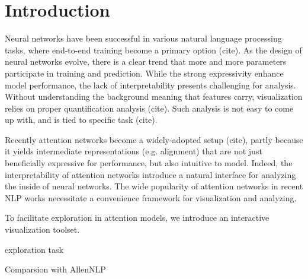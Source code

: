 \section{Introduction}

Neural networks have been successful in various natural language processing tasks,
where end-to-end training become a primary option (cite).
As the design of neural networks evolve, there is a clear trend that more and more
parameters participate in training and prediction. While the strong expressivity
enhance model performance, the lack of interpretability presents challenging for analysis.
Without understanding the background meaning that features carry, visualization relies
on proper quantification analysis (cite). Such analysis is not easy to come up with,
and is tied to specific task (cite).


Recently attention networks become a widely-adopted setup (cite), partly because it yields
intermediate representations (e.g. alignment) that are not just beneficially expressive for performance,
but also intuitive to model. Indeed, the interpretability of attention networks introduce
a natural interface for analyzing the inside of neural networks. The wide popularity of attention networks
in recent NLP works necessitate a convenience framework for visualization and analyzing.

To facilitate exploration in attention models, we introduce an interactive visualization toolset.

exploration task

Comparsion with AllenNLP
